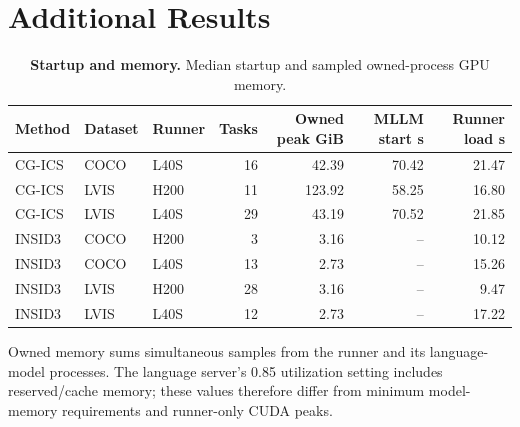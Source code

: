 \section{Additional Results}
\label{app:cost}
\begin{table}[t]
    \centering
    \small
    \caption{\textbf{Startup and memory.} Median startup and sampled owned-process GPU memory.}
    \label{tab:memory}
    \begin{tabularx}{\textwidth}{@{}L{1}L{.8}L{.8}R{.6}R{1.4}R{1.2}R{1.2}@{}}
        \toprule
        Method & Dataset & Runner & Tasks & Owned peak GiB & MLLM start s & Runner load s \\
        \midrule
        CG-ICS & COCO & L40S & 16 & 42.39 & 70.42 & 21.47 \\
        CG-ICS & LVIS & H200 & 11 & 123.92 & 58.25 & 16.80 \\
        CG-ICS & LVIS & L40S & 29 & 43.19 & 70.52 & 21.85 \\
        INSID3 & COCO & H200 & 3 & 3.16 & -- & 10.12 \\
        INSID3 & COCO & L40S & 13 & 2.73 & -- & 15.26 \\
        INSID3 & LVIS & H200 & 28 & 3.16 & -- & 9.47 \\
        INSID3 & LVIS & L40S & 12 & 2.73 & -- & 17.22 \\
        \bottomrule
    \end{tabularx}
\end{table}

Owned memory sums simultaneous samples from the runner and its language-model processes. The language server's 0.85 utilization setting includes reserved/cache memory; these values therefore differ from minimum model-memory requirements and runner-only CUDA peaks.

